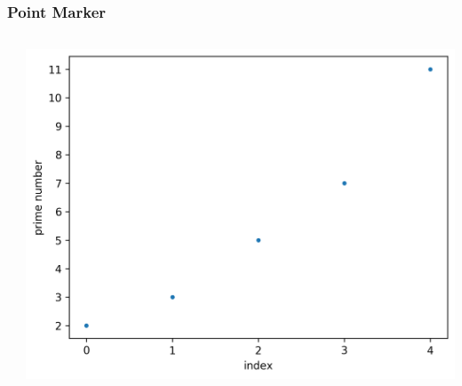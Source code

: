 \documentclass[xcolor={svgnames}]{beamer}
\newcommand{\pyfile}[2][]{}
\begin{document}
\begin{frame}[t,fragile]
    \frametitle{Point Marker}
    \vspace{5mm}
    \begin{columns}[T]
        \begin{column}{0.52\textwidth}
            \pyfile{examples/07-point-marker.py}
        \end{column}
        \begin{column}{0.48\textwidth}
            \includegraphics[width=\textwidth]{img/07-point-marker.png}
        \end{column}
    \end{columns}
\end{frame}
\end{document}
